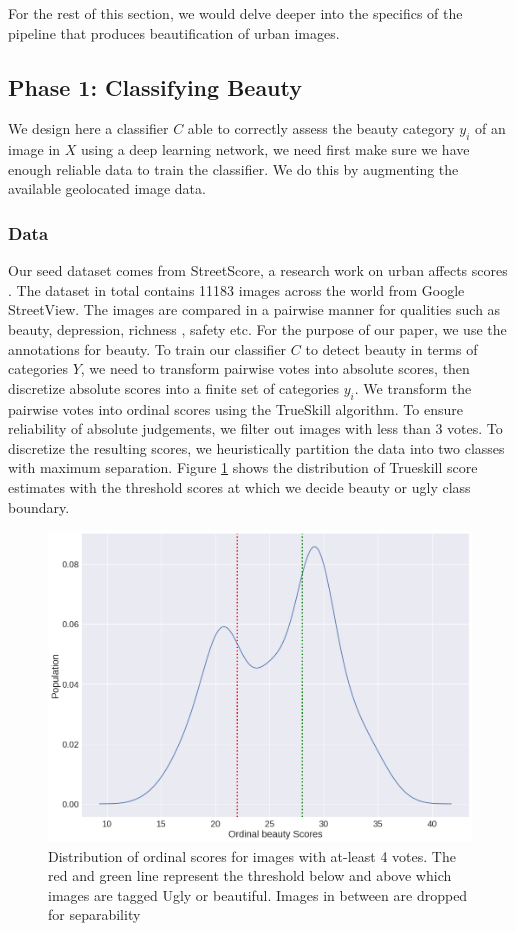 For the rest of this section, we would delve deeper into the specifics of the pipeline that produces beautification of urban images. 

\subsection{Phase 1: Classifying Beauty}
We design here a classifier $C$  able to correctly assess the beauty category $y_i$ of an image in $X$ using a deep learning network, we need first make sure we have enough reliable data to train the classifier. We do this by augmenting the available geolocated image data. 

\subsubsection{ Data }
\label{sec:label}
Our seed dataset comes from StreetScore, a research work on urban affects scores \cite{naik2014streetscore}. The dataset in total contains 11183 images across the world from Google StreetView. The images are compared in a pairwise manner for qualities such as beauty, depression, richness , safety etc. For the purpose of our paper, we use the annotations for beauty. To train our classifier $C$ to detect beauty in terms of categories $Y$, we need to transform pairwise votes into absolute scores, then discretize absolute scores into a finite set of categories $y_i$. We transform the pairwise votes %
into ordinal scores using the TrueSkill \cite{herbrich2007trueskill} algorithm.  To ensure reliability of absolute judgements, we filter out images with less than 3 votes.
To discretize the resulting scores, we heuristically partition the data into two classes with maximum separation. Figure \ref{fig:Trueskill} shows the distribution of Trueskill score estimates with the threshold scores at which we decide beauty or ugly class boundary. 

\begin{figure}[ht]
	\centering
	\includegraphics[width=0.7\columnwidth]{Plot/Trueskill.png}
	\caption{Distribution of ordinal scores for images with at-least 4 votes. The red and green line represent the threshold below and above which images are tagged Ugly or beautiful. Images in between are dropped for separability }
	\label{fig:Trueskill}
\end{figure}



